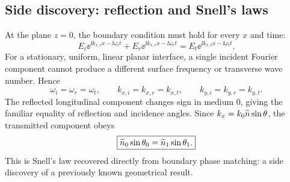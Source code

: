 \subsection{Side discovery: reflection and Snell's laws}
At the plane $z=0$, the boundary condition must hold for every $x$ and time:
\begin{equation}
E_i\ee^{\ii k_{x,i}x-\ii\omega_i t}
+E_r\ee^{\ii k_{x,r}x-\ii\omega_r t}
=E_t\ee^{\ii k_{x,t}x-\ii\omega_t t}.
\end{equation}
For a stationary, uniform, linear planar interface, a single incident Fourier component cannot produce a different surface frequency or transverse wave number. Hence
\begin{equation}
\omega_i=\omega_r=\omega_t,\qquad
k_{x,i}=k_{x,r}=k_{x,t},\qquad k_{y,i}=k_{y,r}=k_{y,t}.
\end{equation}
The reflected longitudinal component changes sign in medium 0, giving the familiar equality of reflection and incidence angles. Since $k_x=k_0\widetilde n\sin\theta$, the transmitted component obeys
\begin{equation}
\boxed{\widetilde n_0\sin\theta_0=\widetilde n_1\sin\theta_1.}
\end{equation}
This is Snell's law recovered directly from boundary phase matching: a side discovery of a previously known geometrical result.


